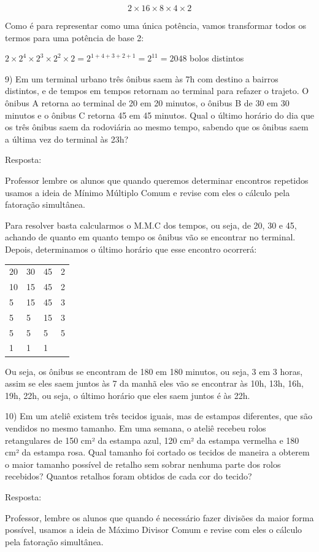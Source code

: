 {{\[2 \times 16 \times 8 \times 4 \times 2\]

Como é para representar como uma única potência, vamos transformar todos
os termos para uma potência de base 2:

\(2 \times 2^{4} \times 2^{3} \times 2^{2} \times 2 = 2^{1 + 4 + 3 + 2 + 1} = 2^{11} = 2048\)
bolos distintos

9) Em um terminal urbano três ônibus saem às 7h com destino a bairros
distintos, e de tempos em tempos retornam ao terminal para refazer o
trajeto. O ônibus A retorna ao terminal de 20 em 20 minutos, o ônibus B
de 30 em 30 minutos e o ônibus C retorna 45 em 45 minutos. Qual o último
horário do dia que os três ônibus saem da rodoviária ao mesmo tempo,
sabendo que os ônibus saem a última vez do terminal às 23h?

Resposta:

Professor lembre os alunos que quando queremos determinar encontros
repetidos usamos a ideia de Mínimo Múltiplo Comum e revise com eles o
cálculo pela fatoração simultânea.

Para resolver basta calcularmos o M.M.C dos tempos, ou seja, de 20, 30 e
45, achando de quanto em quanto tempo os ônibus vão se encontrar no
terminal. Depois, determinamos o último horário que esse encontro
ocorrerá:

\begin{longtable}[]{@{}llll@{}}
\toprule
\endhead
\(20\) & 30 & 45 & 2\tabularnewline
10 & 15 & 45 & 2\tabularnewline
5 & 15 & 45 & 3\tabularnewline
5 & 5 & 15 & 3\tabularnewline
5 & 5 & 5 & 5\tabularnewline
1 & 1 & 1 &\tabularnewline
\bottomrule
\end{longtable}

Ou seja, os ônibus se encontram de 180 em 180 minutos, ou seja, 3 em 3
horas, assim se eles saem juntos às 7 da manhã eles vão se encontrar às
10h, 13h, 16h, 19h, 22h, ou seja, o último horário que eles saem juntos
é às 22h.

10) Em um ateliê existem três tecidos iguais, mas de estampas
diferentes, que são vendidos no mesmo tamanho. Em uma semana, o ateliê
recebeu rolos retangulares de 150 cm² da estampa azul, 120 cm² da
estampa vermelha e 180 cm² da estampa rosa. Qual tamanho foi cortado os
tecidos de maneira a obterem o maior tamanho possível de retalho sem
sobrar nenhuma parte dos rolos recebidos? Quantos retalhos foram obtidos
de cada cor do tecido?

Resposta:

Professor, lembre os alunos que quando é necessário fazer divisões da
maior forma possível, usamos a ideia de Máximo Divisor Comum e revise
com eles o cálculo pela fatoração simultânea.

}}
